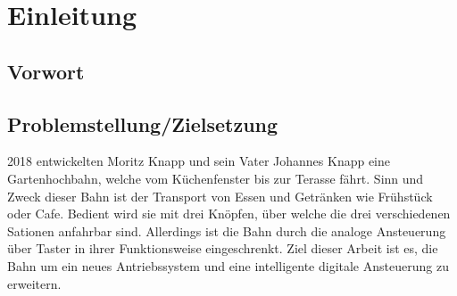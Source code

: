 \chapter{Einleitung}

\section{Vorwort}

\section{Problemstellung/Zielsetzung}
    2018 entwickelten Moritz Knapp und sein Vater Johannes Knapp eine Gartenhochbahn, welche vom Küchenfenster bis zur Terasse fährt. 
    Sinn und Zweck dieser Bahn ist der Transport von Essen und Getränken wie Frühstück oder Cafe. Bedient wird sie mit drei Knöpfen, über welche die drei verschiedenen Sationen anfahrbar sind.
    Allerdings ist die Bahn durch die analoge Ansteuerung über Taster in ihrer Funktionsweise eingeschrenkt. Ziel dieser Arbeit ist es, die Bahn um ein neues Antriebssystem und eine intelligente digitale Ansteuerung zu erweitern.
